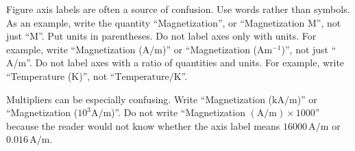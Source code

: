 \documentclass{ifacconf}
\begin{document}
Figure axis labels are often a source of confusion. Use words rather
than symbols. As an example, write the quantity ``Magnetization'', or
``Magnetization M'', not just ``M''. Put units in parentheses. Do not
label axes only with units.  For example, write ``Magnetization
($\mathrm{A}/\mathrm{m}$)'' or ``Magnetization ($\mathrm{A} \mathrm{m}^{-1}$)'', not just
 ``$\mathrm{A}/\mathrm{m}$''. Do not
label axes with a ratio of quantities and units. For example, write
``Temperature ($\mathrm{K}$)'', not ``$\mbox{Temperature}/\mathrm{K}$''.

Multipliers can be especially confusing. Write ``Magnetization
($\mathrm{kA}/\mathrm{m}$)'' or ``Magnetization ($10^3 \mathrm{A}/\mathrm{m}$)''. Do not write
``Magnetization $(\mathrm{A}/\mathrm{m}) \times 1000$'' because the reader would not know
whether the axis label means $16000\,\mathrm{A}/\mathrm{m}$ or $0.016\,\mathrm{A}/\mathrm{m}$.
\end{document}
